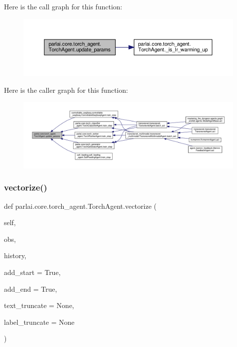 Here is the call graph for this function\+:
\nopagebreak
\begin{figure}[H]
\begin{center}
\leavevmode
\includegraphics[width=350pt]{classparlai_1_1core_1_1torch__agent_1_1TorchAgent_a7e2c9e180887397daa6229a0f9700b1c_cgraph}
\end{center}
\end{figure}
Here is the caller graph for this function\+:
\nopagebreak
\begin{figure}[H]
\begin{center}
\leavevmode
\includegraphics[width=350pt]{classparlai_1_1core_1_1torch__agent_1_1TorchAgent_a7e2c9e180887397daa6229a0f9700b1c_icgraph}
\end{center}
\end{figure}
\mbox{\label{classparlai_1_1core_1_1torch__agent_1_1TorchAgent_a48bb9b153353a0565ab7253dc1daef99}} 
\subsubsection{\texorpdfstring{vectorize()}{vectorize()}}
{\footnotesize\ttfamily def parlai.\+core.\+torch\+\_\+agent.\+Torch\+Agent.\+vectorize (\begin{DoxyParamCaption}\item[{}]{self,  }\item[{}]{obs,  }\item[{}]{history,  }\item[{}]{add\+\_\+start = {\ttfamily True},  }\item[{}]{add\+\_\+end = {\ttfamily True},  }\item[{}]{text\+\_\+truncate = {\ttfamily None},  }\item[{}]{label\+\_\+truncate = {\ttfamily None} }\end{DoxyParamCaption})}

